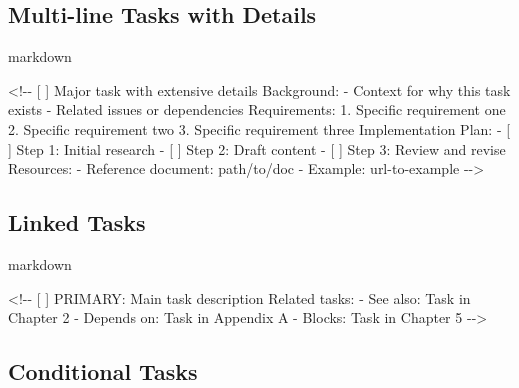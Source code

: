 \documentclass[
  11pt,
  letterpaper,
]{book}
\newenvironment{Shaded}{\begin{snugshade}}{\end{snugshade}}
\newcommand{\CommentTok}[1]{\textcolor[rgb]{0.37,0.37,0.37}{#1}}
\begin{document}

\subsection*{Multi-line Tasks with
Details}\label{multi-line-tasks-with-details}

markdown

\begin{Shaded}
\begin{Highlighting}[]
\CommentTok{\textless{}!{-}{-} [ ] Major task with extensive details}
\CommentTok{  }
\CommentTok{  Background:}
\CommentTok{  {-} Context for why this task exists}
\CommentTok{  {-} Related issues or dependencies}
\CommentTok{  }
\CommentTok{  Requirements:}
\CommentTok{  1. Specific requirement one}
\CommentTok{  2. Specific requirement two}
\CommentTok{  3. Specific requirement three}
\CommentTok{  }
\CommentTok{  Implementation Plan:}
\CommentTok{  {-} [ ] Step 1: Initial research}
\CommentTok{  {-} [ ] Step 2: Draft content}
\CommentTok{  {-} [ ] Step 3: Review and revise}
\CommentTok{  }
\CommentTok{  Resources:}
\CommentTok{  {-} Reference document: path/to/doc}
\CommentTok{  {-} Example: url{-}to{-}example}
\CommentTok{  }
\CommentTok{{-}{-}\textgreater{}}
\end{Highlighting}
\end{Shaded}

\subsection*{Linked Tasks}\label{linked-tasks}

markdown

\begin{Shaded}
\begin{Highlighting}[]
\CommentTok{\textless{}!{-}{-} [ ] PRIMARY: Main task description}
\CommentTok{  Related tasks:}
\CommentTok{  {-} See also: Task in Chapter 2}
\CommentTok{  {-} Depends on: Task in Appendix A}
\CommentTok{  {-} Blocks: Task in Chapter 5}
\CommentTok{{-}{-}\textgreater{}}
\end{Highlighting}
\end{Shaded}

\subsection*{Conditional Tasks}\label{conditional-tasks}
\end{document}

